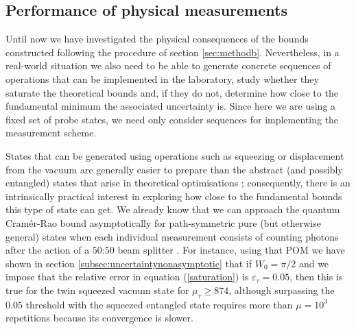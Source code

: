 \subsection{Performance of physical measurements}
\label{measurements_section}

Until now we have investigated the physical consequences of the bounds constructed following the procedure of section \ref{sec:methodb}. Nevertheless, in a real-world situation we also need to be able to generate concrete sequences of operations that can be implemented in the laboratory, study whether they saturate the theoretical bounds and, if they do not, determine how close to the fundamental minimum the associated uncertainty is. Since here we are using a fixed set of probe states, we need only consider sequences for implementing the measurement scheme.

States that can be generated using operations such as squeezing or displacement from the vacuum are generally easier to prepare than the abstract (and possibly entangled) states that arise in theoretical optimisations \cite{rafal2015,PaulProctor2016,schafermeier2018}; consequently, there is an intrinsically practical interest in exploring how close to the fundamental bounds this type of state can get. We already know that we can approach the quantum Cram\'{e}r-Rao bound  asymptotically for path-symmetric pure (but otherwise general) states when each individual measurement consists of counting photons after the action of a $50$:$50$ beam splitter \cite{HofmannHolger2009}. For instance, using that POM we have shown in section \ref{subsec:uncertaintynonasymptotic} that if $W_0 = \pi/2$ and we impose that the relative error in equation (\ref{saturation}) is $\varepsilon_{\tau}=0.05$, then this is true for the twin squeezed vacuum state for $\mu_\tau \geqslant 874$, although surpassing the $0.05$ threshold with the squeezed entangled state requires more than $\mu = 10^3$ repetitions because its convergence is slower.


